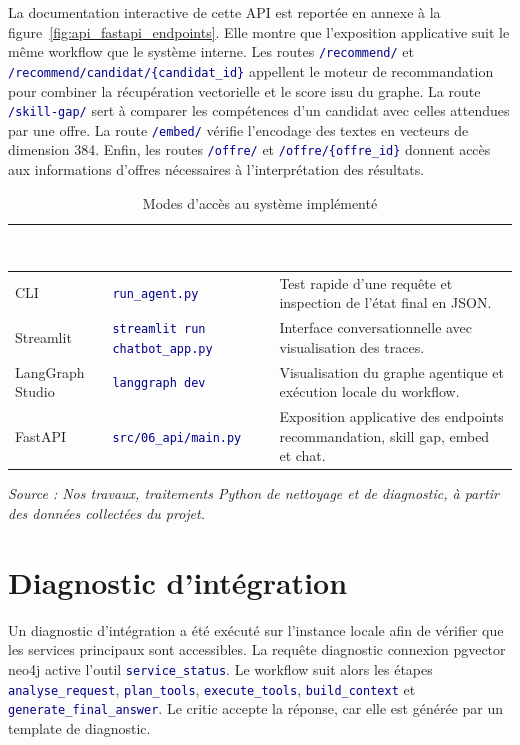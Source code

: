\documentclass[12pt,twoside]{report}
\newcommand{\source}[1]{%
  \par\vspace{0.2\baselineskip}
  {\centering\footnotesize\itshape Source : #1\par}
}
\newcommand{\filevar}[1]{\texttt{\textcolor{darkblue}{#1}}}
\newcommand{\tabheader}[1]{\textcolor{white}{\textbf{#1}}}
\newcommand{\tableStyleStart}{%
  \small
  \renewcommand{\arraystretch}{1.12}%
  \setlength{\tabcolsep}{4pt}%
  \rowcolors{2}{lightblue!12}{white}%
}
\newcommand{\tableStyleEnd}{%
  \rowcolors{2}{}{}%
  \renewcommand{\arraystretch}{1}%
}
\begin{document}
La documentation interactive de cette API est reportée en annexe à la figure~\ref{fig:api_fastapi_endpoints}. Elle montre que l'exposition applicative suit le même workflow que le système interne. Les routes \filevar{/recommend/} et \filevar{/recommend/candidat/\{candidat\_id\}} appellent le moteur de recommandation pour combiner la récupération vectorielle et le score issu du graphe. La route \filevar{/skill-gap/} sert à comparer les compétences d'un candidat avec celles attendues par une offre. La route \filevar{/embed/} vérifie l'encodage des textes en vecteurs de dimension 384. Enfin, les routes \filevar{/offre/} et \filevar{/offre/\{offre\_id\}} donnent accès aux informations d'offres nécessaires à l'interprétation des résultats.

\begin{table}[H]
  \centering
  \caption{Modes d'accès au système implémenté}
  \label{tab:interfaces_chap3}
  \tableStyleStart
  \begin{tabularx}{\textwidth}{p{3.2cm}p{4.4cm}X}
    \rowcolor{darkblue}
    \tabheader{Interface} & \tabheader{Commande ou point d'entrée} & \tabheader{Usage principal} \\
    \midrule
    CLI & \filevar{run\_agent.py} & Test rapide d'une requête et inspection de l'état final en JSON. \\
    Streamlit & \filevar{streamlit run chatbot\_app.py} & Interface conversationnelle avec visualisation des traces. \\
    LangGraph Studio & \filevar{langgraph dev} & Visualisation du graphe agentique et exécution locale du workflow. \\
    FastAPI & \filevar{src/06\_api/main.py} & Exposition applicative des endpoints recommandation, skill gap, embed et chat. \\
    \bottomrule
  \end{tabularx}
  \tableStyleEnd
  \source{Nos travaux, traitements Python de nettoyage et de diagnostic, à partir des données collectées du projet.}
\end{table}

\section{Diagnostic d'intégration}

Un diagnostic d'intégration a été exécuté sur l'instance locale afin de vérifier que les services principaux sont accessibles. La requête \og diagnostic connexion pgvector neo4j \fg{} active l'outil \filevar{service\_status}. Le workflow suit alors les étapes \filevar{analyse\_request}, \filevar{plan\_tools}, \filevar{execute\_tools}, \filevar{build\_context} et \filevar{generate\_final\_answer}. Le critic accepte la réponse, car elle est générée par un template de diagnostic.
\end{document}
